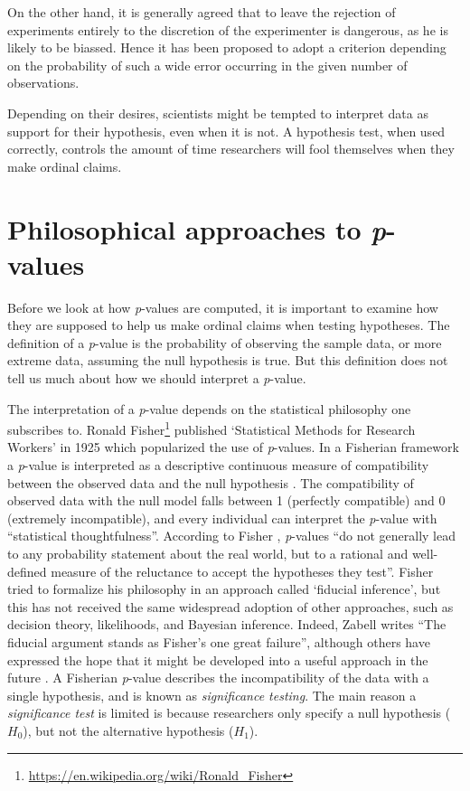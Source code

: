 \documentclass[
  oneside]{krantz}
\renewenvironment{quote}{\begin{VF}}{\end{VF}}
\renewcommand{\href}[2]{#2\footnote{\url{#1}}}
\begin{document}
\begin{quote}
On the other hand, it is generally agreed that to leave the rejection of experiments entirely to the discretion of the experimenter is dangerous, as he is likely to be biassed. Hence it has been proposed to adopt a criterion depending on the probability of such a wide error occurring in the given number of observations.
\end{quote}

Depending on their desires, scientists might be tempted to interpret data as support for their hypothesis, even when it is not. A hypothesis test, when used correctly, controls the amount of time researchers will fool themselves when they make ordinal claims.

\hypertarget{philosophical-approaches-to-p-values}{%
\section{\texorpdfstring{Philosophical approaches to \emph{p}-values}{Philosophical approaches to p-values}}\label{philosophical-approaches-to-p-values}}

Before we look at how \emph{p}-values are computed, it is important to examine how they are supposed to help us make ordinal claims when testing hypotheses. The definition of a \emph{p}-value is the probability of observing the sample data, or more extreme data, assuming the null hypothesis is true. But this definition does not tell us much about how we should interpret a \emph{p}-value.

The interpretation of a \emph{p}-value depends on the statistical philosophy one subscribes to. \href{https://en.wikipedia.org/wiki/Ronald_Fisher}{Ronald Fisher} published `Statistical Methods for Research Workers' in 1925 which popularized the use of \emph{p}-values. In a Fisherian framework a \emph{p}-value is interpreted as a descriptive continuous measure of compatibility between the observed data and the null hypothesis \citep{greenland_statistical_2016}. The compatibility of observed data with the null model falls between 1 (perfectly compatible) and 0 (extremely incompatible), and every individual can interpret the \emph{p}-value with ``statistical thoughtfulness''. According to Fisher \citeyearpar{fisher_statistical_1956}, \emph{p}-values ``do not generally lead to any probability statement about the real world, but to a rational and well-defined measure of the reluctance to accept the hypotheses they test''. Fisher tried to formalize his philosophy in an approach called `fiducial inference', but this has not received the same widespread adoption of other approaches, such as decision theory, likelihoods, and Bayesian inference. Indeed, Zabell \citeyearpar{zabell_r_1992} writes ``The fiducial argument stands as Fisher's one great failure'', although others have expressed the hope that it might be developed into a useful approach in the future \citep{schweder_confidence_2016}. A Fisherian \emph{p}-value describes the incompatibility of the data with a single hypothesis, and is known as \emph{significance testing}. The main reason a \emph{significance test} is limited is because researchers only specify a null hypothesis (\(H_0\)), but not the alternative hypothesis (\(H_1\)).
\end{document}
